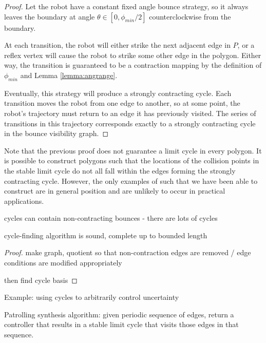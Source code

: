 \documentclass[]{styles/svproc}  %
\begin{document}
\begin{proof}

Let the robot have a constant fixed angle bounce strategy, so it always leaves
the boundary at angle $\theta \in [0,\phi_{min}/2]$ counterclockwise from the
boundary.

At each transition, the robot will either strike the next adjacent edge in
$P$, or a reflex vertex will cause the robot to strike some other edge in the
polygon. Either way, the transition is guaranteed to be a contraction mapping by
the definition of $\phi_{min}$ and Lemma \ref{lemma:angrange}.

Eventually, this strategy will produce a strongly contracting cycle. Each
transition moves the robot from one edge to another, so at some point, the
robot's trajectory must return to an edge it has previously visited. The series
of transitions in this trajectory corresponds exactly to a strongly contracting
cycle in the bounce visibility graph.

\end{proof}

Note that the previous proof does not guarantee a limit cycle in every polygon.
It is possible to construct polygons such that the locations of the collision
points in the stable limit cycle do not all fall within the edges forming the
strongly contracting cycle. However, the only examples of such that we have been
able to construct are in general position and are unlikely to occur in practical
applications.

\begin{lemma}
cycles can contain non-contracting bounces - there are lots of cycles
\end{lemma}


\begin{theorem}
cycle-finding algorithm is sound, complete up to bounded length
\end{theorem}

\begin{proof}
make graph, quotient so that non-contraction edges are removed / edge conditions
are modified appropriately

then find cycle basis
\end{proof}

Example: using cycles to arbitrarily control uncertainty


Patrolling synthesis algorithm: given periodic sequence of edges, return a controller that
results in a stable limit cycle that visits those edges in that sequence.
\end{document}
